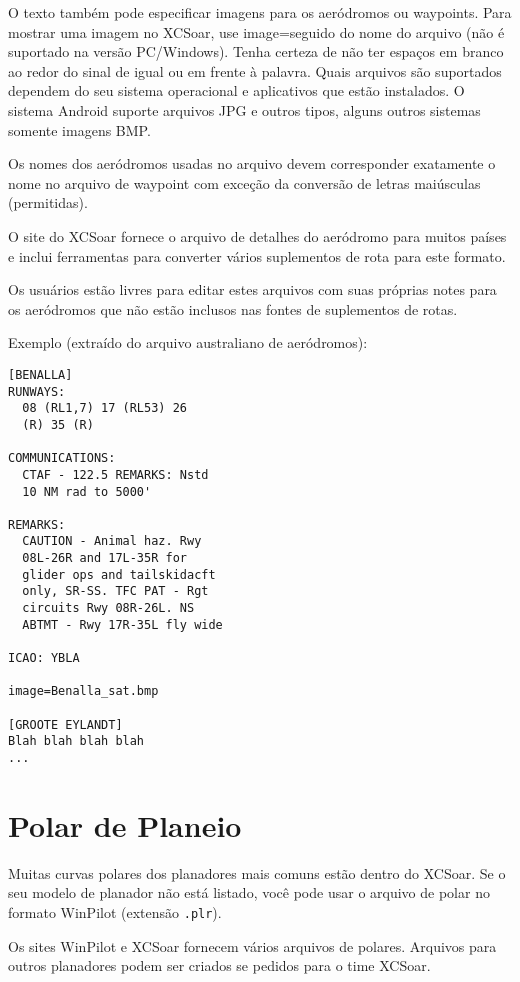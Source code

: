 O texto também pode especificar imagens para os aeródromos ou waypoints.  Para mostrar uma imagem no XCSoar, use image=seguido do nome do arquivo (não é suportado na versão PC/Windows).  Tenha certeza de não ter espaços em branco ao redor do sinal de igual ou em frente à palavra.  Quais arquivos são suportados dependem do seu sistema operacional e aplicativos que estão instalados.  O sistema Android suporte arquivos JPG e outros tipos, alguns outros sistemas somente imagens BMP.

Os nomes dos aeródromos usadas no arquivo devem corresponder exatamente o nome no arquivo de waypoint com exceção da conversão de letras maiúsculas (permitidas).

O site do XCSoar fornece o arquivo de detalhes do aeródromo para muitos países e inclui ferramentas para converter vários suplementos de rota para este formato.

Os usuários estão livres para editar estes arquivos com suas próprias notes para os aeródromos que não estão inclusos nas fontes de suplementos de rotas.

Exemplo (extraído do arquivo australiano de aeródromos):

\begin{verbatim}
[BENALLA]
RUNWAYS:
  08 (RL1,7) 17 (RL53) 26
  (R) 35 (R)

COMMUNICATIONS:
  CTAF - 122.5 REMARKS: Nstd
  10 NM rad to 5000'

REMARKS:
  CAUTION - Animal haz. Rwy
  08L-26R and 17L-35R for
  glider ops and tailskidacft
  only, SR-SS. TFC PAT - Rgt
  circuits Rwy 08R-26L. NS
  ABTMT - Rwy 17R-35L fly wide

ICAO: YBLA

image=Benalla_sat.bmp

[GROOTE EYLANDT]
Blah blah blah blah
...
\end{verbatim}

\section{Polar de Planeio} \label{sec:glide-polar}

Muitas curvas polares dos planadores mais comuns estão dentro do XCSoar.  Se o seu modelo de planador não está listado, você pode usar o arquivo de polar no formato WinPilot (extensão  \verb|.plr|).

Os sites WinPilot e XCSoar fornecem vários arquivos de polares.  Arquivos para outros planadores podem ser criados se pedidos para o time XCSoar.

